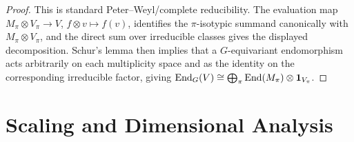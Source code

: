 \documentclass[11pt]{article}
\begin{document}
\begin{proof}
This is standard Peter--Weyl/complete reducibility. The evaluation map
\(M_\pi\otimes V_\pi\to V\), \(f\otimes v\mapsto f(v)\), identifies the \(\pi\)-isotypic summand canonically with \(M_\pi\otimes V_\pi\), and the direct sum over irreducible classes gives the displayed decomposition. Schur's lemma then implies that a $G$-equivariant endomorphism acts arbitrarily on each multiplicity space and as the identity on the corresponding irreducible factor, giving \(\operatorname{End}_G(V)\cong\bigoplus_\pi \operatorname{End}(M_\pi)\otimes\mathbf 1_{V_\pi}\).
\end{proof}


\section{Scaling and Dimensional Analysis}
\label{p1:sec:scaling-analysis}
\end{document}
